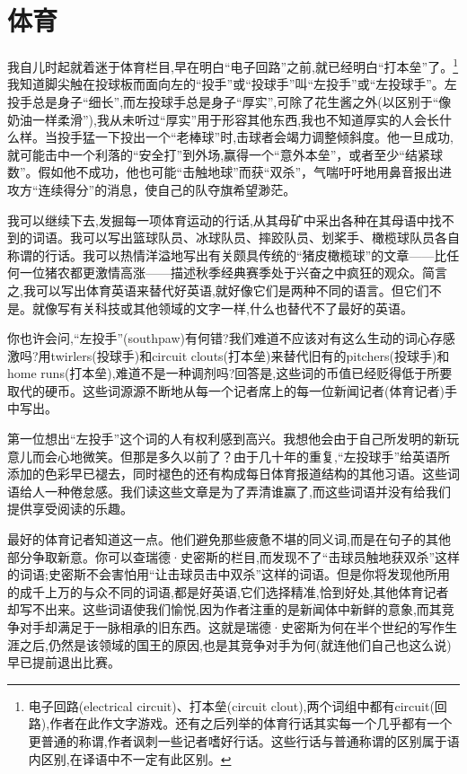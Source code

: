 \chapter{体育}
我自儿时起就着迷于体育栏目,早在明白“电子回路”之前,就已经明白“打本垒”了。\footnote{电子回路(electrical circuit)、打本垒(circuit clout),两个词组中都有circuit(回路),作者在此作文字游戏。还有之后列举的体育行话其实每一个几乎都有一个更普通的称谓,作者讽刺一些记者嗜好行话。这些行话与普通称谓的区别属于语内区别,在译语中不一定有此区别。}我知道脚尖触在投球板而面向左的“投手”或“投球手”叫“左投手”或“左投球手”。左投手总是身子“细长”,而左投球手总是身子“厚实”,可除了花生酱之外(以区别于“像奶油一样柔滑”),我从未听过“厚实”用于形容其他东西,我也不知道厚实的人会长什么样。当投手猛一下投出一个“老棒球”时,击球者会竭力调整倾斜度。他一旦成功,就可能击中一个利落的“安全打”到外场,赢得一个“意外本垒”，或者至少“结紧球数”。假如他不成功，他也可能“击触地球”而获“双杀”，气喘吁吁地用鼻音报出进攻方“连续得分”的消息，使自己的队夺旗希望渺茫。

我可以继续下去,发掘每一项体育运动的行话,从其母矿中采出各种在其母语中找不到的词语。我可以写出篮球队员、冰球队员、摔跤队员、划桨手、橄榄球队员各自称谓的行话。我可以热情洋溢地写出有关颇具传统的“猪皮橄榄球”的文章——比任何一位猪农都更激情高涨——描述秋季经典赛季处于兴奋之中疯狂的观众。简言之,我可以写出体育英语来替代好英语,就好像它们是两种不同的语言。但它们不是。就像写有关科技或其他领域的文字一样,什么也替代不了最好的英语。

你也许会问,“左投手”(southpaw)有何错?我们难道不应该对有这么生动的词心存感激吗?用twirlers(投球手)和circuit clouts(打本垒)来替代旧有的pitchers(投球手)和home runs(打本垒),难道不是一种调剂吗?回答是,这些词的币值已经贬得低于所要取代的硬币。这些词源源不断地从每一个记者席上的每一位新闻记者(体育记者)手中写出。

第一位想出“左投手”这个词的人有权利感到高兴。我想他会由于自己所发明的新玩意儿而会心地微笑。但那是多久以前了？由于几十年的重复,“左投球手”给英语所添加的色彩早已褪去，同时褪色的还有构成每日体育报道结构的其他习语。这些词语给人一种倦怠感。我们读这些文章是为了弄清谁赢了,而这些词语并没有给我们提供享受阅读的乐趣。

最好的体育记者知道这一点。他们避免那些疲惫不堪的同义词,而是在句子的其他部分争取新意。你可以查瑞德·史密斯的栏目,而发现不了“击球员触地获双杀”这样的词语;史密斯不会害怕用“让击球员击中双杀”这样的词语。但是你将发现他所用的成千上万的与众不同的词语,都是好英语,它们选择精准,恰到好处,其他体育记者却写不出来。这些词语使我们愉悦,因为作者注重的是新闻体中新鲜的意象,而其竞争对手却满足于一脉相承的旧东西。这就是瑞德·史密斯为何在半个世纪的写作生涯之后,仍然是该领域的国王的原因,也是其竞争对手为何(就连他们自己也这么说)早已提前退出比赛。


